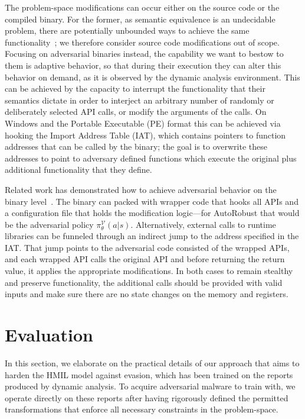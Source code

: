 The problem-space modifications can occur either on the source code or the compiled binary.
For the former, as semantic equivalence is an undecidable problem, there are potentially unbounded ways to achieve the same functionality~\cite{baldan2021rice}; we therefore consider source code modifications out of scope.
Focusing on adversarial binaries instead, the capability we want to bestow to them is adaptive behavior, so that during their execution they can alter this behavior on demand, as it is observed by the dynamic analysis environment.
This can be achieved by the capacity to interrupt the functionality that their semantics dictate in order to interject an arbitrary number of randomly or deliberately selected API calls, or modify the arguments of the calls.
On Windows and the Portable Executable (PE) format this can be achieved via hooking the Import Address Table (IAT), which contains pointers to function addresses that can be called by the binary; the goal is to overwrite these addresses to point to adversary defined functions which execute the original plus additional functionality that they define.

Related work has demonstrated how to achieve adversarial behavior on the binary level~\cite{rosenberg2018generic, fadadu2019evading}.
The binary can packed with wrapper code that hooks all APIs and a configuration file that holds the modification logic---for AutoRobust that would be the adversarial policy $\pi_\theta^\mathcal{V}(a|s)$.
Alternatively, external calls to runtime libraries can be funneled through an indirect jump to the address specified in the IAT.
That jump points to the adversarial code consisted of the wrapped APIs, and each wrapped API calls the original API and before returning the return value, it applies the appropriate modifications.
In both cases to remain stealthy and preserve functionality, the additional calls should be provided with valid inputs and make sure there are no state changes on the memory and registers.

\section{Evaluation}
\label{sec:eval}

In this section, we elaborate on the practical details of our approach that aims to harden the \gls{HMIL} model against evasion, which has been trained on the reports produced by dynamic analysis.
To acquire adversarial malware to train with, we operate directly on these reports after having rigorously defined the permitted transformations that enforce all necessary constraints in the problem-space.

